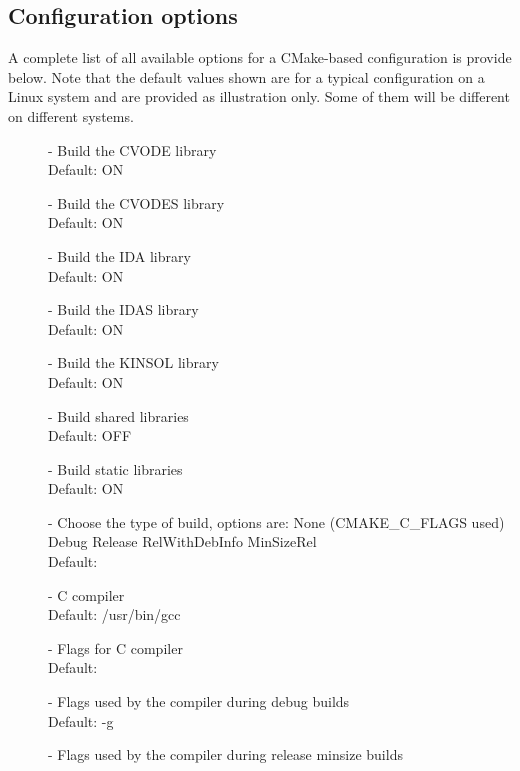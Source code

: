 \subsection{Configuration options}

A complete list of all available options for a CMake-based {\sundials}
configuration is provide below. Note that the default values shown are for 
a typical configuration on a Linux system and are provided as illustration only.
Some of them will be different on different systems.

\begin{description}
\item[] - 
  Build the CVODE library 
  \\
  Default: ON
\item[] - 
  Build the CVODES library 
  \\
  Default: ON
\item[] - 
   Build the IDA library 
  \\
   Default: ON
\item[] - 
  Build the IDAS library 
  \\
  Default: ON
\item[] - 
  Build the KINSOL library 
  \\
  Default: ON
\item[] - 
  Build shared libraries
  \\
  Default: OFF 
\item[] - 
  Build static libraries
  \\
  Default: ON 
\item[] -  
  Choose the type of build, options are: 
  None (CMAKE\_C\_FLAGS used) Debug Release RelWithDebInfo MinSizeRel
  \\
  Default:
\item[] - 
  C compiler
  \\
  Default: /usr/bin/gcc 
\item[] -  
  Flags for C compiler
  \\
  Default:
\item[] -      
  Flags used by the compiler during debug builds
  \\
  Default: -g 
\item[] -  
  Flags used by the compiler during release minsize builds
  \\

\end{description}
